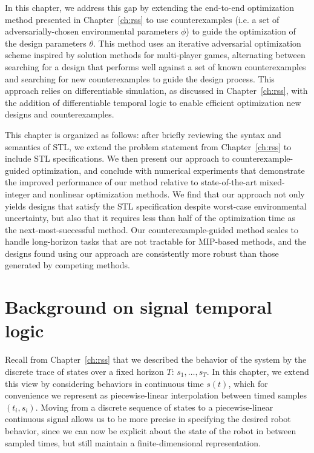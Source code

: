 In this chapter, we address this gap by extending the end-to-end optimization method presented in Chapter~\ref{ch:rss} to use counterexamples (i.e. a set of adversarially-chosen environmental parameters $\phi$) to guide the optimization of the design parameters $\theta$. This method uses an iterative adversarial optimization scheme inspired by solution methods for multi-player games, alternating between searching for a design that performs well against a set of known counterexamples and searching for new counterexamples to guide the design process. This approach relies on differentiable simulation, as discussed in Chapter~\ref{ch:rss}, with the addition of differentiable temporal logic to enable efficient optimization new designs and counterexamples.

This chapter is organized as follows: after briefly reviewing the syntax and semantics of STL, we extend the problem statement from Chapter~\ref{ch:rss} to include STL specifications. We then present our approach to counterexample-guided optimization, and conclude with numerical experiments that demonstrate the improved performance of our method relative to state-of-the-art mixed-integer and nonlinear optimization methods. We find that our approach not only yields designs that satisfy the STL specification despite worst-case environmental uncertainty, but also that it requires less than half of the optimization time as the next-most-successful method. Our counterexample-guided method scales to handle long-horizon tasks that are not tractable for MIP-based methods, and the designs found using our approach are consistently more robust than those generated by competing methods.

\section{Background on signal temporal logic}

Recall from Chapter~\ref{ch:rss} that we described the behavior of the system by the discrete trace of states over a fixed horizon $T$: $s_1, \ldots, s_T$. In this chapter, we extend this view by considering behaviors in continuous time $s(t)$, which for convenience we represent as piecewise-linear interpolation between timed samples $(t_i, s_i)$. Moving from a discrete sequence of states to a piecewise-linear continuous signal allows us to be more precise in specifying the desired robot behavior, since we can now be explicit about the state of the robot in between sampled times, but still maintain a finite-dimensional representation.

